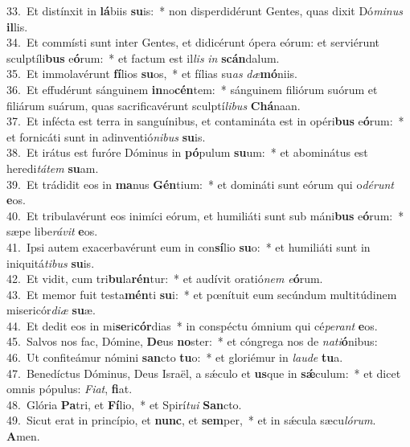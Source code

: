 {33.~}Et distínxit in \textbf{lá}biis \textbf{su}is:~* non disperdidérunt Gentes, quas dixit Dó\textit{mi}\textit{nus} \textbf{il}lis.\\
{34.~}Et commísti sunt inter Gentes, et didicérunt ópera eórum: et serviérunt sculptíli\textbf{bus} e\textbf{ó}rum:~* et factum est il\textit{lis} \textit{in} \textbf{scán}dalum.\\
{35.~}Et immolavérunt \textbf{fí}lios \textbf{su}os,~* et fílias su\textit{as} \textit{dæ}\textbf{mó}niis.\\
{36.~}Et effudérunt sánguinem \textbf{in}no\textbf{cén}tem:~* sánguinem filiórum suórum et filiárum suárum, quas sacrificavérunt sculptí\textit{li}\textit{bus} \textbf{Chá}naan.\\
{37.~}Et infécta est terra in sanguínibus, et contamináta est in opéri\textbf{bus} e\textbf{ó}rum:~* et fornicáti sunt in adinventió\textit{ni}\textit{bus} \textbf{su}is.\\
{38.~}Et irátus est furóre Dóminus in \textbf{pó}pulum \textbf{su}um:~* et abominátus est heredi\textit{tá}\textit{tem} \textbf{su}am.\\
{39.~}Et trádidit eos in \textbf{ma}nus \textbf{Gén}tium:~* et domináti sunt eórum qui o\textit{dé}\textit{runt} \textbf{e}os.\\
{40.~}Et tribulavérunt eos inimíci eórum, et humiliáti sunt sub máni\textbf{bus} e\textbf{ó}rum:~* sæpe libe\textit{rá}\textit{vit} \textbf{e}os.\\
{41.~}Ipsi autem exacerbavérunt eum in con\textbf{sí}lio \textbf{su}o:~* et humiliáti sunt in iniquitá\textit{ti}\textit{bus} \textbf{su}is.\\
{42.~}Et vidit, cum tri\textbf{bu}la\textbf{rén}tur:~* et audívit oratió\textit{nem} \textit{e}\textbf{ó}rum.\\
{43.~}Et memor fuit testa\textbf{mén}ti \textbf{su}i:~* et pœnítuit eum secúndum multitúdinem misericór\textit{di}\textit{æ} \textbf{su}æ.\\
{44.~}Et dedit eos in mi\textbf{se}ri\textbf{cór}dias~* in conspéctu ómnium qui cé\textit{pe}\textit{rant} \textbf{e}os.\\
{45.~}Salvos nos fac, Dómine, \textbf{De}us \textbf{no}ster:~* et cóngrega nos de \textit{na}\textit{ti}\textbf{ó}nibus:\\
{46.~}Ut confiteámur nómini \textbf{san}cto \textbf{tu}o:~* et gloriémur in \textit{lau}\textit{de} \textbf{tu}a.\\
{47.~}Benedíctus Dóminus, Deus Israël, a sǽculo et \textbf{us}que in \textbf{sǽ}culum:~* et dicet omnis pópulus: \textit{Fi}\textit{at}, \textbf{fi}at.\\
{48.~}Glória \textbf{Pa}tri, et \textbf{Fí}lio,~* et Spirí\textit{tu}\textit{i} \textbf{San}cto.\\
{49.~}Sicut erat in princípio, et \textbf{nunc}, et \textbf{sem}per,~* et in sǽcula sæcu\textit{ló}\textit{rum}. \textbf{A}men.\\
